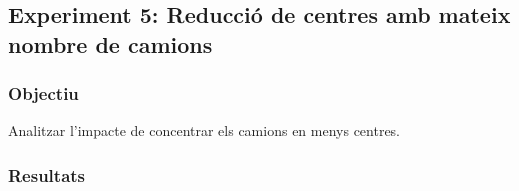 \subsection{Experiment 5: Reducció de centres amb mateix nombre de camions}

\subsubsection{Objectiu}
Analitzar l'impacte de concentrar els camions en menys centres.


\subsubsection{Resultats}




